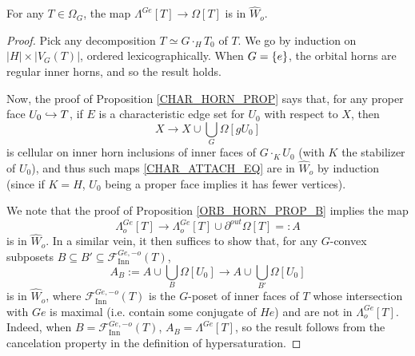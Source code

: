 \documentclass[a4paper,10pt,draft]{article}%
\begin{document}
\begin{proposition}
      \label{HORN_ORB_PROP}
      For any $T \in \Omega_G$, the map
      $\Lambda^{G e}[T] \to \Omega[T]$
      is in $\hat{W}_o$.
\end{proposition}
\begin{proof}
      Pick any decomposition $T \simeq G \cdot_H T_0$ of $T$.
      We go by induction on $|H| \times |V_G(T)|$, ordered lexicographically.
      When $G = \left\{e\right\}$, the orbital horns are regular inner horns, and so the result holds.

      Now, the proof of
      {\color{blue} Proposition \ref{CHAR_HORN_PROP}}
      says that,
      for any proper face $U_0 \hookrightarrow T$,
      if $E$ is a characteristic edge set for $U_0$ with respect to $X$, then
      \begin{equation}
            \label{CHAR_ATTACH_EQ}
            X \to X \cup \mathop{\bigcup}\limits_G \Omega[g U_0]
      \end{equation}
      is cellular on inner horn inclusions of inner faces of $G \cdot_K U_0$ (with $K$ the stabilizer of $U_0$),
      and thus such maps \eqref{CHAR_ATTACH_EQ} are in $\hat{W}_o$ by induction
      (since if $K = H$, $U_0$ being a proper face implies it has fewer vertices).

      {\color{blue} %
        We note that the proof of Proposition \ref{ORB_HORN_PROP_B} implies the map
        \begin{equation}
              \Lambda^{G e}_o[T] \to \Lambda_o^{G e}[T] \cup \partial^{out}\Omega[T] =:A
        \end{equation}
        is in $\hat{W}_o$.  
        In a similar vein,
        it then suffices to show that, for any $G$-convex subposets
        $B \subseteq B' \subseteq \mathscr{F}_{\mathrm{Inn}}^{G e,-o}(T)$,
        \begin{equation}
              \label{ORB_HORN_ATTACH_EQ}
              A_B
              := A \cup \mathop{\bigcup}\limits_{B}\Omega[U_0]
              \to
              A \cup \mathop{\bigcup}\limits_{B'}\Omega[U_0]
        \end{equation}
        is in $\hat{W}_o$,
        where $\mathscr{F}_{\mathrm{Inn}}^{G e,-o}(T)$ is
        the $G$-poset of inner faces of $T$ whose intersection with $G e$ is maximal
        (i.e. contain some conjugate of $H e$)
        and are not in $\Lambda^{G e}_o[T]$.
        Indeed, when $B = \mathscr{F}_{\mathrm{Inn}}^{G e,-o}(T)$, $A_B = \Lambda^{G e}[T]$,
        so the result follows from the cancelation property in the definition of hypersaturation.
        
}
\end{proof}
\end{document}
